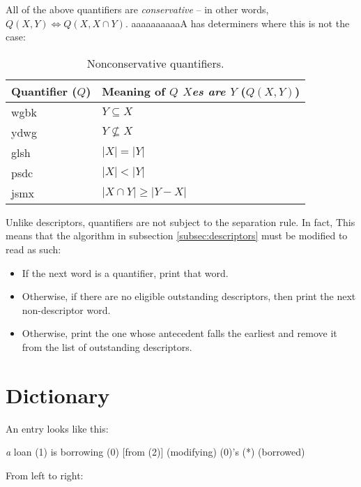 \documentclass{book}
\newcommand{\lname}{aaaaaaaaaaA}
\begin{document}
All of the above quantifiers are \emph{conservative} -- in other words, $Q(X, Y) \iff Q(X, X \cap Y)$. \lname{} has determiners where this is not the case:

\begin{table}[ht]
  \caption{Nonconservative quantifiers.}
  \centering
  \begin{tabu}to 
    \textnormal{Quantifier ($Q$)} & Meaning of \emph{$Q$ $X$es are $Y$} ($Q(X, Y)$) \\
    \hline
    wgbk & $Y \subseteq X$ \\
    ydwg & $Y \not\subseteq X$ \\
    glsh & $|X| = |Y|$ \\
    psdc & $|X| < |Y|$ \\
    jsmx & $|X \cap Y| \ge |Y - X|$ \\
  \end{tabu}
\end{table}

Unlike descriptors, quantifiers are not subject to the separation rule. In fact, \emph{} This means that the algorithm in subsection \ref{subsec:descriptors} must be modified to read as such:

\begin{itemize}
  \item If the next word is a quantifier, print that word.
  \item Otherwise, if there are no eligible outstanding descriptors, then print the next non-descriptor word.
  \item Otherwise, print the one whose antecedent falls the earliest and remove it from the list of outstanding descriptors.
\end{itemize}

\appendix

\chapter{Dictionary}

An entry looks like this:

 \textit{a}
\quad loan \quad (1) is borrowing (0) [from (2)] \quad (modifying) (0)'s (*) (borrowed)

From left to right:
\end{document}

